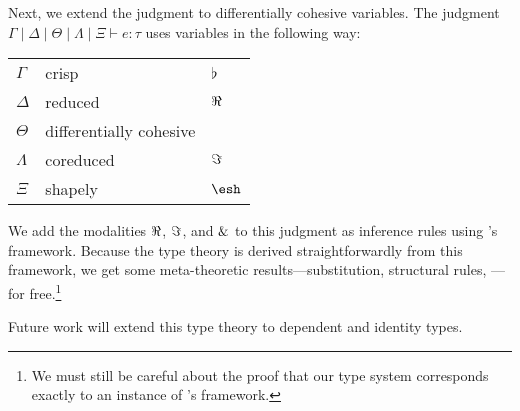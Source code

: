 \documentclass{article}
\begin{document}
Next, we extend the judgment to differentially cohesive variables. The judgment
$\Gamma \mid \Delta \mid \Theta \mid \Lambda \mid \Xi \vdash e : \tau$ uses
variables in the following way:
\begin{center} \begin{tabular}{lll}
    $\Gamma$ & crisp  &  $\flat$ \\
    $\Delta$ & reduced & $\Re$ \\
    $\Theta$ & differentially cohesive & \\
    $\Lambda$ & coreduced & $\Im$ \\
    $\Xi$ & shapely & $\shape$
\end{tabular} \end{center}
%
We add the modalities $\Re$, $\Im$, and $\&$ to this judgment as inference
rules using \citeauthor{Licata2017}'s framework. Because the type theory is
derived straightforwardly from this framework, we get some meta-theoretic
results---substitution, structural rules, \etc---for free.\footnote{We must
  still be careful about the proof that our type system corresponds exactly to
  an instance of \citeauthor{Licata2017}'s framework.} 


Future work will extend this type theory to dependent and identity types.





\end{document}
